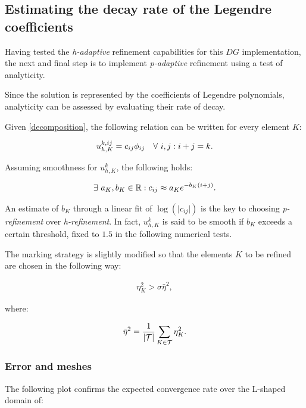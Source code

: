 \subsection{Estimating the decay rate of the Legendre coefficients}

Having tested the \textit{h-adaptive} refinement capabilities for this $DG$ implementation, the next and final step is to implement \textit{p-adaptive} refinement using a test of analyticity.

\cite{Eibner2007} Since the solution is represented by the coefficients of Legendre polynomials, analyticity can be assessed by evaluating their rate of decay.

Given \eqref{decomposition}, the following relation can be written for every element $K$:

\begin{gather}
    u^{k, ij}_{h, K} = c_{ij} \phi_{ij} \quad \forall ~ i, j : i + j = k.
\end{gather}

Assuming smoothness for $u^k_{h, K}$, the following holds:

\begin{gather}
    \exists ~ a_K, b_K \in \mathbb{R} : c_{ij} \approx a_K e^{-b_K (i + j)}.
\end{gather}

An estimate of $b_K$ through a linear fit of $\log(\lvert c_{ij} \rvert)$ is the key to choosing \textit{p-refinement} over \textit{h-refinement}. In fact, $u^k_{h, K}$ is said to be smooth if $b_K$ exceeds a certain threshold, fixed to $1.5$ in the following numerical tests.

The marking strategy is slightly modified so that the elements $K$ to be refined are chosen in the following way:

\begin{gather}
    \eta_K^2 > \sigma \bar{\eta}^2,
\end{gather}

where:

\begin{gather}
    \bar{\eta}^2 = \frac{1}{\lvert \mathcal{T} \rvert} \sum_{K \in \mathcal{T}} \eta_K^2.
\end{gather}

\newpage
\subsubsection{Error and meshes}

\cite{Eibner2007} The following plot confirms the expected convergence rate over the L-shaped domain of:


